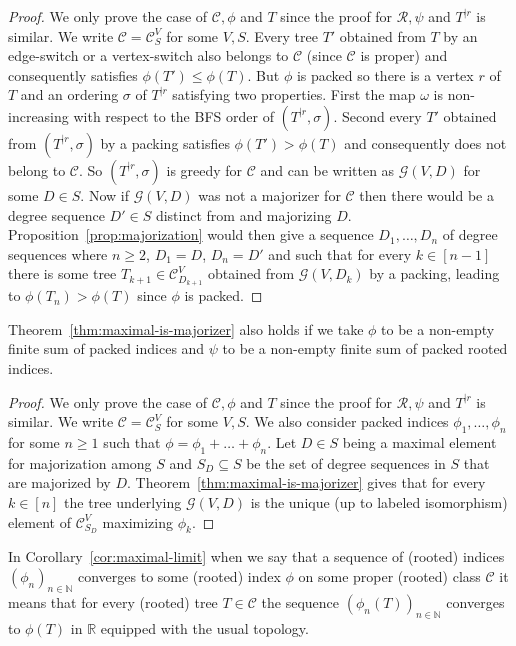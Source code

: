 \documentclass[11 pt]{modarticle}
\newcommand{\cN}{\mathbb{N}}
\newcommand{\cR}{\mathbb{R}}
\newcommand{\wmap}{\omega}
\newcommand{\rtree}[2]{{#1}^{\lvert #2}}
\newcommand{\ortree}[3]{(\rtree{#1}{#2},{#3})}
\newcommand{\tclass}{\mathcal{C}}
\newcommand{\rtclass}{\mathcal{R}}
\newcommand{\smallpclass}[2]{\tclass^{#1}_{#2}}
\newcommand{\greedy}[2]{\mathcal{G}(#1,#2)}
\newcommand{\pclass}[2]{\tclass^{#1}_{#2}}
\begin{document}
\begin{proof}
We only prove the case of $\tclass, \phi$ and $T$ since the proof for $\rtclass, \psi$ and $\rtree{T}{r}$ is similar. We write $\tclass = \pclass{V}{S}$ for some $V,S$. Every tree $T'$ obtained from $T$ by an edge-switch or a vertex-switch also belongs to $\tclass$ (since $\tclass$ is proper) and consequently satisfies $\phi(T') \leq \phi(T)$. But $\phi$ is packed so there is a vertex $r$ of $T$ and an ordering $\sigma$ of $\rtree{T}{r}$ satisfying two properties. First the map $\wmap$ is non-increasing with respect to the BFS order of $\ortree{T}{r}{\sigma}$. Second every $T'$ obtained from $\ortree{T}{r}{\sigma}$ by a packing satisfies $\phi(T') > \phi(T)$ and consequently does not belong to $\tclass$. So $\ortree{T}{r}{\sigma}$ is greedy for $\tclass$ and can be written as $\greedy{V}{D}$ for some $D \in S$. Now if $\greedy{V}{D}$ was not a majorizer for $\tclass$ then there would be a degree sequence $D' \in S$ distinct from and majorizing $D$. Proposition~\ref{prop:majorization} would then give a sequence $D_1, \dots, D_n$ of degree sequences where $n \geq 2$, $D_1 = D$, $D_n = D'$ and such that for every $k \in [n-1]$ there is some tree $T_{k+1} \in \pclass{V}{D_{k+1}}$ obtained from $\greedy{V}{D_k}$ by a packing, leading to $\phi(T_n) > \phi(T)$ since $\phi$ is packed.
\end{proof}


\begin{cor}\label{cor:maximal-finite-sum}
Theorem~\ref{thm:maximal-is-majorizer} also holds if we take $\phi$ to be a non-empty finite sum of packed indices and $\psi$ to be a non-empty finite sum of packed rooted indices.
\end{cor}

\begin{proof}
We only prove the case of $\tclass, \phi$ and $T$ since the proof for $\rtclass, \psi$ and $\rtree{T}{r}$ is similar.  We write $\tclass = \pclass{V}{S}$ for some $V,S$. We also consider packed indices $\phi_1, \dots, \phi_n$ for some $n \geq 1$ such that $\phi = \phi_1 + \dots + \phi_n$. Let $D \in S$ being a maximal element for majorization among $S$ and $S_D \subseteq S$ be the set of degree sequences in $S$ that are majorized by $D$. Theorem~\ref{thm:maximal-is-majorizer} gives that for every $k \in [n]$ the tree underlying $\greedy{V}{D}$ is the unique (up to labeled isomorphism) element of $\smallpclass{V}{S_D}$ maximizing $\phi_k$.
\end{proof}

In Corollary~\ref{cor:maximal-limit} when we say that a sequence of (rooted) indices $(\phi_n)_{n \in \cN}$ converges to some (rooted) index $\phi$ on some proper (rooted) class $\tclass$ it means that for every (rooted) tree $T \in \tclass$ the sequence $(\phi_n(T))_{n \in \cN}$ converges to $\phi(T)$ in $\cR$ equipped with the usual topology.
\end{document}
